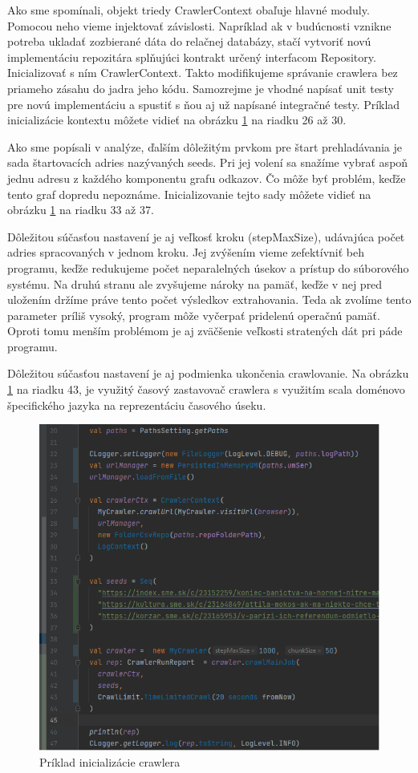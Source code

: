 Ako sme spomínali, objekt triedy CrawlerContext obaľuje hlavné moduly. Pomocou neho vieme injektovať závislosti. Napríklad ak v budúcnosti vznikne potreba ukladať zozbierané dáta do relačnej databázy, stačí vytvoriť novú implementáciu repozitára splňujúci kontrakt určený interfacom Repository. Inicializovať s ním CrawlerContext. Takto modifikujeme správanie crawlera bez priameho zásahu do jadra jeho kódu. Samozrejme je vhodné napísať unit testy pre novú implementáciu a spustiť s ňou aj už napísané integračné testy. Príklad inicializácie kontextu môžete vidieť na obrázku \ref{o:initCrawl} na riadku 26 až 30.

Ako sme popísali v analýze, ďalším dôležitým prvkom pre štart prehladávania je sada štartovacích adries nazývaných seeds. Pri jej volení sa snažíme vybrať aspoň jednu adresu z každého komponentu grafu odkazov. Čo môže byť problém, keďže tento graf dopredu nepoznáme. Inicializovanie tejto sady môžete vidieť na obrázku \ref{o:initCrawl} na riadku 33 až 37.

Dôležitou súčasťou nastavení je aj veľkosť kroku (stepMaxSize), udávajúca počet adries spracovaných v jednom kroku. Jej zvýšením vieme zefektívniť beh programu, keďže redukujeme počet neparalelných úsekov a prístup do súborového systému. Na druhú stranu ale zvyšujeme nároky na pamäť, keďže v nej pred uložením držíme práve tento počet výsledkov extrahovania. Teda ak zvolíme tento parameter príliš vysoký, program môže vyčerpať pridelenú operačnú pamäť. Oproti tomu menším problémom je aj zväčšenie veľkosti stratených dát pri páde programu. 

Dôležitou súčasťou nastavení je aj podmienka ukončenia crawlovanie. Na obrázku \ref{o:initCrawl} na riadku 43, je využitý časový zastavovač crawlera s využitím scala doménovo špecifického jazyka na reprezentáciu časového úseku. 


\begin{figure}[!ht]
    \centering
    \includegraphics[width=.9\textwidth]{figures/crawlInit.png}
    \caption{Príklad inicializácie crawlera}
    \label{o:initCrawl}
\end{figure}

